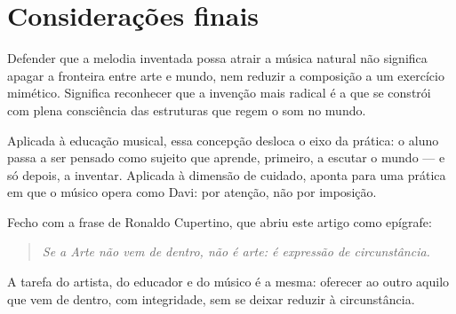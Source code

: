 \documentclass[12pt,a4paper]{article}
\begin{document}
\section{Considerações finais}

Defender que a melodia inventada possa atrair a música natural não significa apagar a fronteira entre arte e mundo, nem reduzir a composição a um exercício mimético. Significa reconhecer que a invenção mais radical é a que se constrói com plena consciência das estruturas que regem o som no mundo.

Aplicada à educação musical, essa concepção desloca o eixo da prática: o aluno passa a ser pensado como sujeito que aprende, primeiro, a escutar o mundo --- e só depois, a inventar. Aplicada à dimensão de cuidado, aponta para uma prática em que o músico opera como Davi: por atenção, não por imposição.

Fecho com a frase de Ronaldo Cupertino, que abriu este artigo como epígrafe:

\begin{quote}
\itshape Se a Arte não vem de dentro, não é arte: é expressão de circunstância.
\end{quote}

A tarefa do artista, do educador e do músico é a mesma: oferecer ao outro aquilo que vem de dentro, com integridade, sem se deixar reduzir à circunstância.
\end{document}
